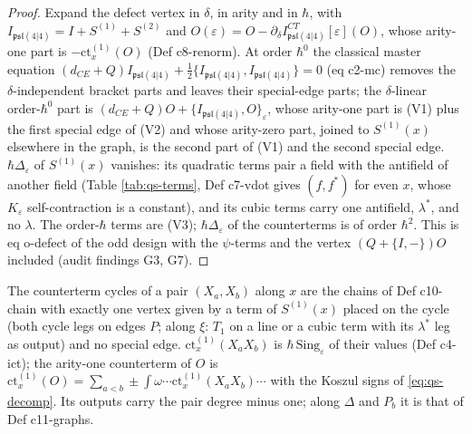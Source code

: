 \begin{proof}
Expand the defect vertex in $\delta$, in arity and in $\hbar$, with $I_{\mathfrak{psl}(4|4)}=I+S^{(1)}+S^{(2)}$ and $O(\varepsilon)=O-\partial_\delta I^{CT}_{\mathfrak{psl}(4|4)}[\varepsilon](O)$, whose arity-one part is $-\mathrm{ct}^{(1)}_x(O)$ (Def c8-renorm). At order $\hbar^0$ the classical master equation $(d_{CE}+Q)I_{\mathfrak{psl}(4|4)}+\tfrac12\{I_{\mathfrak{psl}(4|4)},I_{\mathfrak{psl}(4|4)}\}=0$ (eq c2-mc) removes the $\delta$-independent bracket parts and leaves their special-edge parts; the $\delta$-linear order-$\hbar^0$ part is $(d_{CE}+Q)O+\{I_{\mathfrak{psl}(4|4)},O\}_\varepsilon$, whose arity-one part is (V1) plus the first special edge of (V2) and whose arity-zero part, joined to $S^{(1)}(x)$ elsewhere in the graph, is the second part of (V1) and the second special edge. $\hbar\Delta_\varepsilon$ of $S^{(1)}(x)$ vanishes: its quadratic terms pair a field with the antifield of another field (Table \ref{tab:qs-terms}, Def c7-vdot gives $(f,f^*)$ for even $x$, whose $K_\varepsilon$ self-contraction is a constant), and its cubic terms carry one antifield, $\lambda^*$, and no $\lambda$. The order-$\hbar$ terms are (V3); $\hbar\Delta_\varepsilon$ of the counterterms is of order $\hbar^2$. This is eq o-defect of the odd design with the $\psi$-terms and the vertex $(Q+\{I,-\})O$ included (audit findings G3, G7).
\end{proof}

\begin{definition}
\label{def:qs-ct1}
The counterterm cycles of a pair $(X_a,X_b)$ along $x$ are the chains of Def c10-chain with exactly one vertex given by a term of $S^{(1)}(x)$ placed on the cycle (both cycle legs on edges $P$; along $\xi$: $T_1$ on a line or a cubic term with its $\lambda^*$ leg as output) and no special edge. $\mathrm{ct}^{(1)}_x(X_aX_b)$ is $\hbar\,\mathrm{Sing}_\varepsilon$ of their values (Def c4-ict); the arity-one counterterm of $O$ is $\mathrm{ct}^{(1)}_x(O)=\sum_{a<b}\pm\int\omega\cdots\mathrm{ct}^{(1)}_x(X_aX_b)\cdots$ with the Koszul signs of \eqref{eq:qs-decomp}. Its outputs carry the pair degree minus one; along $\Delta$ and $P_b$ it is that of Def c11-graphs.
\end{definition}

